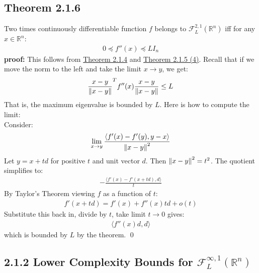 \documentclass[12pt,a4paper]{article}
\begin{document}
	\subsection*{Theorem 2.1.6}\label{thm216}
	Two times continuously differentiable function $f$ belongs to $\mathcal{F}_L^{2,1}(\mathbb{R}^n) $ iff for any $x \in \mathbb{R}^n$:
	\begin{align*}
		0 \preceq f''(x) \preceq L I_n
	\end{align*} 
	\textbf{proof:} This follows from \hyperref[thm214]{Theorem 2.1.4} and \hyperref[thm215_4]{Theorem 2.1.5 (4)}. Recall that if we move the norm to the left and take the limit $x \rightarrow y$, we get:
	\begin{align*}
		\frac{x - y}{\norm{x - y}}^T f''(x) \frac{x - y}{\norm{x - y}} \leq L
	\end{align*}
	That is, the maximum eigenvalue is bounded by $L$. Here is how to compute the limit:\\
	Consider:
	\begin{align*}
		\lim_{x \rightarrow y} \frac{\langle f'(x) - f'(y), y - x \rangle}{\norm{x - y}^2}
	\end{align*}
	Let $y = x + td$ for positive $t$ and unit vector $d$. Then $\norm{x - y}^2 = t^2$. The quotient simplifies to:
	\begin{align*}
		- \frac{\langle f'(x) - f'(x + td), d \rangle}{t}
	\end{align*}
	By Taylor's Theorem viewing $f$ as a function of $t$:
	\begin{align*}
		f'(x + td) = f'(x) + f''(x)td + o(t)
	\end{align*}
	Substitute this back in, divide by $t$, take limit $t \rightarrow 0$ gives:
	\begin{align*}
		\langle f''(x)d, d \rangle
	\end{align*}
	which is bounded by $L$ by the theorem. \qed 
	
	\subsection*{2.1.2 Lower Complexity Bounds for $\mathcal{F}_L^{\infty, 1}(\mathbb{R}^n)$}\label{sec212}
\end{document}
